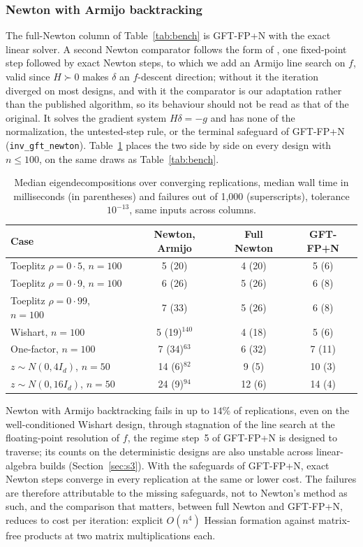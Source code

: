 \documentclass[11pt]{article}
\begin{document}
\subsubsection{Newton with Armijo backtracking}\label{sec:newtonsafe}

The full-Newton column of Table~\ref{tab:bench} is GFT-FP+N with the
exact linear solver. A second Newton comparator follows the form of
\citet{ChenFeiYu:2025}, one fixed-point step followed by exact Newton
steps, to which we add an Armijo line search on $f$, valid since
$H\succ0$ makes $\delta$ an $f$-descent direction; without it the
iteration diverged on most designs, and with it the comparator is our
adaptation rather than the published algorithm, so its behaviour
should not be read as that of the original. It solves the gradient
system $H\delta=-g$ and has none of the normalization, the
untested-step rule, or the terminal safeguard of GFT-FP+N
(\texttt{inv\_gft\_newton}). Table~\ref{tab:newtonsafe}
places the two side by side on every design with $n\leq100$, on the
same draws as Table~\ref{tab:bench}.

\begin{table}[h]
\centering
\caption{Median eigendecompositions over converging replications, median
wall time in milliseconds (in parentheses) and failures out of 1{,}000
(superscripts), tolerance $10^{-13}$, same inputs across
columns.}\label{tab:newtonsafe}
\medskip
\begin{tabular}{lccc}
\toprule
Case & Newton, Armijo & Full Newton & GFT-FP+N\\
\midrule
Toeplitz $\rho=0{\cdot}5$, $n=100$  & 5 (20) & 4 (20) & 5 (6)\\
Toeplitz $\rho=0{\cdot}9$, $n=100$  & 6 (26) & 5 (26) & 6 (8)\\
Toeplitz $\rho=0{\cdot}99$, $n=100$ & 7 (33) & 5 (26) & 6 (8)\\
Wishart, $n=100$                    & 5 (19)$^{140}$ & 4 (18) & 5 (6)\\
One-factor, $n=100$                 & 7 (34)$^{63}$ & 6 (32) & 7 (11)\\
$z\sim N(0,4I_d)$, $n=50$           & 14 (6)$^{82}$ & 9 (5) & 10 (3)\\
$z\sim N(0,16I_d)$, $n=50$          & 24 (9)$^{94}$ & 12 (6) & 14 (4)\\
\bottomrule
\end{tabular}
\end{table}

Newton with Armijo backtracking fails in up to $14$\% of
replications, even on the well-conditioned Wishart design, through
stagnation of the line search at the floating-point resolution of
$f$, the regime step~5 of GFT-FP+N is designed to traverse; its counts
on the deterministic designs are also unstable across linear-algebra
builds (Section~\ref{sec:s3}). With the safeguards of GFT-FP+N, exact
Newton steps converge in every replication at the same or lower cost.
The failures are therefore attributable to the missing safeguards,
not to Newton's method as such, and the comparison that matters,
between full Newton and GFT-FP+N, reduces to cost per iteration:
explicit $O(n^{4})$ Hessian formation against matrix-free products at
two matrix multiplications each.
\end{document}
